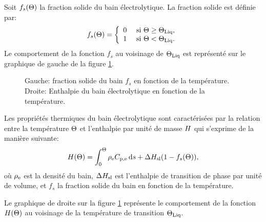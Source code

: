 Soit $f_s(\Theta)$ la fraction solide du bain électrolytique. La
fraction solide est définie par:
\begin{equation}
  f_s(\Theta) = \left\{
  \begin{array}{ll}
    0           & \text{ si } \Theta \geq \Theta_\text{Liq},\\
    1           & \text{ si } \Theta < \Theta_\text{Liq}.
  \end{array}
  \right.
\end{equation}
Le comportement de la fonction $f_s$ au voisinage de $\Theta_\text{Liq}$ est
représenté sur le graphique de gauche de la figure
\ref{fig:solid-fraction-enthalpy}.

\begin{figure}
  \begin{center}
    
    
    \caption{Gauche: fraction solide du bain $f_s$ en fonction de la
      température. Droite: Enthalpie du bain électrolytique en
      fonction de la température.}
    \label{fig:solid-fraction-enthalpy}
  \end{center}
\end{figure}

Les propriétés thermiques du bain électrolytique sont
caractérisées par la relation entre la température $\Theta$ et
l'enthalpie par unité de masse $H$ qui s'exprime de la manière
suivante:
\begin{equation}\label{eq:enthalpy}
  \enthalpy(\temperature) = %
    \int_0^\temperature
      \electrolytedensity\electrolytehc\intd{s} %
    + \fusionenthalpy(1 - f_s(\temperature)),
\end{equation}
où $\rho_\mathrm{e}$ est la densité du bain, $\Delta H_\mathrm{sl}$ est
l'enthalpie de transition de phase par unité de volume, et $f_s$ la
fraction solide du bain en fonction de la température.

Le graphique de droite sur la figure \ref{fig:solid-fraction-enthalpy}
représente le comportement de la fonction $H(\Theta)$ au
voisinage de la température de transition $\Theta_\text{Liq}$.


